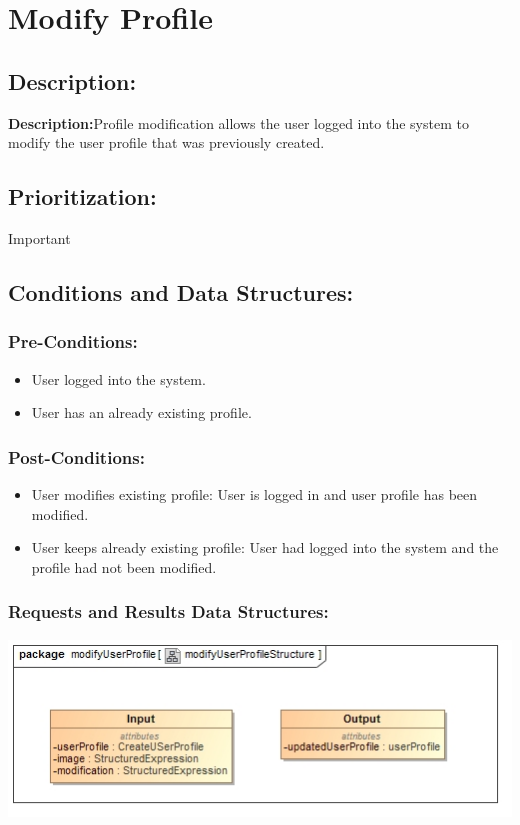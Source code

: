 \documentclass[a4paper,11pt]{article}
\begin{document}
\section{Modify Profile}
\subsection*{Description:}
\textbf{Description:}Profile modification allows the user logged into the system to modify the user profile that was previously created.
\subsection{Prioritization:}
\textbf{}Important
\subsection{Conditions and Data Structures:}
\subsubsection*{Pre-Conditions:}
\begin{itemize}
\item User logged into the system. 
\item User has an already existing profile. 
\end{itemize}
\subsubsection*{Post-Conditions:}
\begin{itemize}
\item User modifies existing profile: User is logged in and user profile has been modified. 
\item User keeps already existing profile: User had logged into the system and the profile had not been modified. 
\end{itemize}
\subsubsection*{Requests and Results Data Structures:}
\includegraphics[width=1\linewidth]{./Images/UserProfile/ModifyUserProfileStructure}
\end{document}
